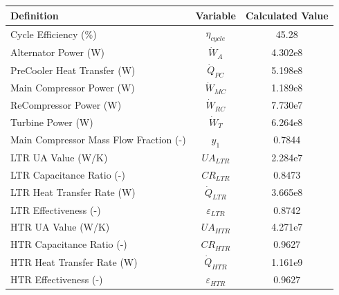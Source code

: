 \begin{paracol}{2}
\begin{specialtable}[H]
    \begin{tabular}{lcc}
    \toprule
    \textbf{Definition} & \textbf{Variable} & \textbf{Calculated Value}\\
    \midrule
    Cycle Efficiency (\%) & $\eta_{cycle}$ & 45.28\\
    Alternator Power (W) & $\dot{W}_{A}$ & 4.302e8\\
    PreCooler Heat Transfer (W) & $\dot{Q}_{PC}$ & 5.198e8\\
    Main Compressor Power (W) & $\dot{W}_{MC}$ & 1.189e8\\ 
    ReCompressor Power (W) & $\dot{W}_{RC}$ & 7.730e7\\ 
    Turbine Power (W) & $\dot{W}_{T}$ & 6.264e8\\
    Main Compressor Mass Flow Fraction (-) & $y_{1}$ & 0.7844\\
    LTR UA Value (W/K) & $UA_{LTR}$ & 2.284e7\\
    LTR Capacitance Ratio (-) & $CR_{LTR}$ & 0.8473\\
    LTR Heat Transfer Rate (W) & $\dot{Q}_{LTR}$ & 3.665e8\\
    LTR Effectiveness (-) & $\varepsilon_{LTR}$ & 0.8742\\
    HTR UA Value (W/K) & $UA_{HTR}$ & 4.271e7\\
    HTR Capacitance Ratio (-) & $CR_{HTR}$ & 0.9627\\
    HTR Heat Transfer Rate (W) & $\dot{Q}_{HTR}$ & 1.161e9\\
    HTR Effectiveness (-) & $\varepsilon_{HTR}$ & 0.9627\\
    \bottomrule
    \end{tabular}\\
\end{specialtable}


\end{paracol}
